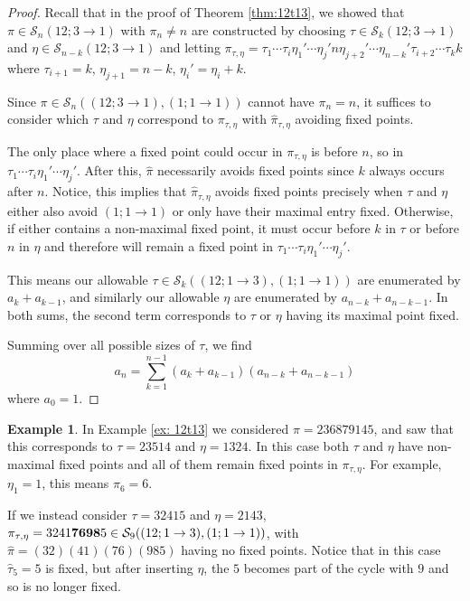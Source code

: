 \documentclass[11pt]{article}
\renewcommand\S{\mathcal S}
\theoremstyle{definition}
\newtheorem{example}[theorem]{Example}
\begin{document}
\begin{proof}
    Recall that in the proof of Theorem \ref{thm:12t13}, we showed that $\pi \in \S_n(12;3 \to 1)$ with $\pi_n \not= n$ are constructed by choosing $\tau \in \S_k(12;3 \to 1)$ and $\eta \in \S_{n-k}(12;3 \to 1)$ and letting $\pi_{\tau,\eta} = \tau_1 \cdots \tau_{i} \eta_1' \cdots \eta_j' n \eta_{j+2}' \cdots \eta_{n-k}' \tau_{i+2}\cdots \tau_k k$ where $\tau_{i+1} = k$, $\eta_{j+1} = n-k$, $\eta_i' = \eta_i + k$.

    Since $\pi \in \S_n((12; 3 \to 1),(1; 1 \to 1))$ cannot have $\pi_n = n$, it suffices to consider which $\tau$ and $\eta$ correspond to $\pi_{\tau,\eta}$ with $\hat\pi_{\tau,\eta}$ avoiding fixed points.

    The only place where a fixed point could occur in $\pi_{\tau,\eta}$ is before $n$, so in $\tau_1 \cdots \tau_i \eta_1' \cdots \eta_j'$. After this, $\hat\pi$ necessarily avoids fixed points since $k$ always occurs after $n$. Notice, this implies that $\hat\pi_{\tau,\eta}$ avoids fixed points precisely when $\tau$ and $\eta$ either also avoid $(1; 1\to1)$ or only have their maximal entry fixed. Otherwise, if either contains a non-maximal fixed point, it must occur before $k$ in $\tau$ or before $n$ in $\eta$ and therefore will remain a fixed point in $\tau_1 \cdots \tau_i \eta_1' \cdots \eta_j'$.

    This means our allowable $\tau \in \S_k((12;1\to3),(1;1\to1))$ are enumerated by $a_k + a_{k-1}$, and similarly our allowable $\eta$ are enumerated by $a_{n-k} + a_{n-k-1}$. In both sums, the second term corresponds to $\tau$ or $\eta$ having its maximal point fixed.

    Summing over all possible sizes of $\tau$, we find
    \[
    a_n = \sum_{k=1}^{n-1} (a_k + a_{k-1})(a_{n-k} + a_{n-k-1})
    \]
    where $a_0 = 1$. 
    \end{proof}

\begin{example}
    In Example \ref{ex: 12t13} we considered $\pi = 236879145$, and saw that this corresponds to $\tau = 23514$ and $\eta = 1324$. In this case both $\tau$ and $\eta$ have non-maximal fixed points and all of them remain fixed points in $\pi_{\tau,\eta}$. For example, $\eta_1 = 1$, this means $\hat\pi_6 = 6$.

    If we instead consider $\tau = 32415$ and $\eta = 2143$, $\pi_{\tau,\eta} = 3241{\bf 7698}5 \in \S_9((12;1\to3),(1;1\to1))$, with $\hat\pi = (32)(41)(76)(985)$ having no fixed points. Notice that in this case $\hat\tau_5 = 5$ is fixed, but after inserting $\eta$, the $5$ becomes part of the cycle with $9$ and so is no longer fixed.
\end{example}
\end{document}
